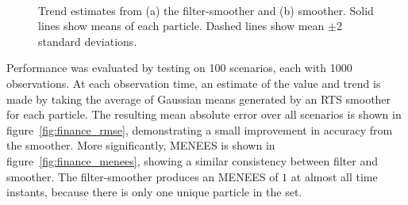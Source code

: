 \documentclass[10pt,twocolumn,twoside]{IEEEtran}
\begin{document}
\begin{figure}[!t]
\centering
{} \\
\caption{Trend estimates from (a) the filter-smoother and (b) smoother. Solid lines show means of each particle. Dashed lines show mean $\pm$2 standard deviations.}
\label{fig:example_state}
\end{figure}
%
Performance was evaluated by testing on 100 scenarios, each with 1000 observations. At each observation time, an estimate of the value and trend is made by taking the average of Gaussian means generated by an RTS smoother for each particle. The resulting mean absolute error over all scenarios is shown in figure~\ref{fig:finance_rmse}, demonstrating a small improvement in accuracy from the smoother. More significantly, MENEES is shown in figure~\ref{fig:finance_menees}, showing a similar consistency between filter and smoother. The filter-smoother produces an MENEES of $1$ at almost all time instants, because there is only one unique particle in the set.%
%
\end{document}
